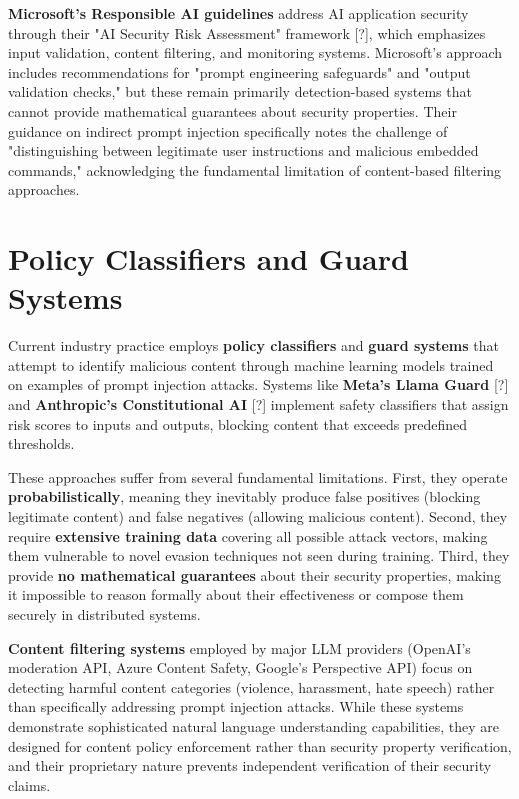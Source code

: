 \textbf{Microsoft's Responsible AI guidelines} address AI application security through their "AI Security Risk Assessment" framework [?], which emphasizes input validation, content filtering, and monitoring systems. Microsoft's approach includes recommendations for "prompt engineering safeguards" and "output validation checks," but these remain primarily detection-based systems that cannot provide mathematical guarantees about security properties. Their guidance on indirect prompt injection specifically notes the challenge of "distinguishing between legitimate user instructions and malicious embedded commands," acknowledging the fundamental limitation of content-based filtering approaches.

\section{Policy Classifiers and Guard Systems}

Current industry practice employs \textbf{policy classifiers} and \textbf{guard systems} that attempt to identify malicious content through machine learning models trained on examples of prompt injection attacks. Systems like \textbf{Meta's Llama Guard} [?] and \textbf{Anthropic's Constitutional AI} [?] implement safety classifiers that assign risk scores to inputs and outputs, blocking content that exceeds predefined thresholds.

These approaches suffer from several fundamental limitations. First, they operate \textbf{probabilistically}, meaning they inevitably produce false positives (blocking legitimate content) and false negatives (allowing malicious content). Second, they require \textbf{extensive training data} covering all possible attack vectors, making them vulnerable to novel evasion techniques not seen during training. Third, they provide \textbf{no mathematical guarantees} about their security properties, making it impossible to reason formally about their effectiveness or compose them securely in distributed systems.

\textbf{Content filtering systems} employed by major LLM providers (OpenAI's moderation API, Azure Content Safety, Google's Perspective API) focus on detecting harmful content categories (violence, harassment, hate speech) rather than specifically addressing prompt injection attacks. While these systems demonstrate sophisticated natural language understanding capabilities, they are designed for content policy enforcement rather than security property verification, and their proprietary nature prevents independent verification of their security claims.

